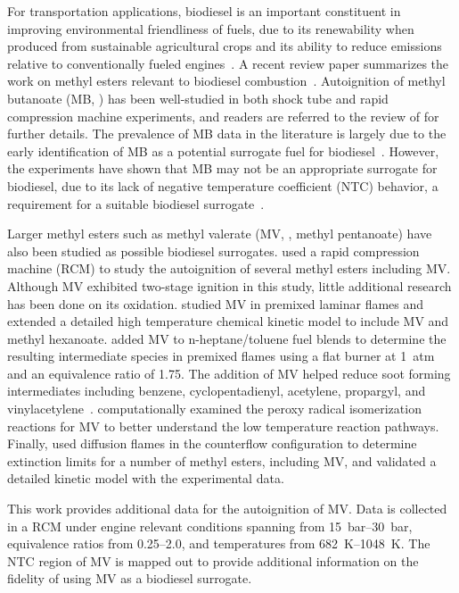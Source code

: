 \documentclass[12pt]{../ussci}
\begin{document}
For transportation applications, biodiesel is an important constituent in
improving environmental friendliness of fuels, due to its renewability when
produced from sustainable agricultural crops and its ability to reduce emissions
relative to conventionally fueled engines~\autocite{Hoekman2012}. A recent
review paper summarizes the work on methyl esters relevant to biodiesel
combustion~\autocite{Coniglio2013}. Autoignition of methyl butanoate (MB,
) has been well-studied in both shock tube and rapid compression
machine experiments, and readers are referred to the review of
\textcite{Coniglio2013} for further details. The prevalence of MB data in the
literature is largely due to the early identification of MB as a potential
surrogate fuel for biodiesel~\autocite{Fisher2000}. However, the experiments
have shown that MB may not be an appropriate surrogate for biodiesel, due to its
lack of negative temperature coefficient (NTC) behavior, a requirement for a
suitable biodiesel surrogate~\autocite{Coniglio2013}.

Larger methyl esters such as methyl valerate (MV, , methyl
pentanoate) have also been studied as possible biodiesel surrogates.
\textcite{Hadj-Ali2009} used a rapid compression machine (RCM) to study the
autoignition of several methyl esters including MV. Although MV exhibited
two-stage ignition in this study, little additional research has been done on
its oxidation. \textcite{Korobeinichev2015} studied MV in premixed laminar
flames and extended a detailed high temperature chemical kinetic model to
include MV and methyl hexanoate. \textcite{Dmitriev2015} added MV to
n-heptane/toluene fuel blends to determine the resulting intermediate species in
premixed flames using a flat burner at \SI{1}{atm} and an equivalence ratio of
1.75. The addition of MV helped reduce soot forming intermediates including
benzene, cyclopentadienyl, acetylene, propargyl, and
vinylacetylene~\autocite{Dmitriev2015}. \textcite{Hayes2009} computationally
examined the peroxy radical isomerization reactions for MV to better understand
the low temperature reaction pathways. Finally, \textcite{Dievart2013} used
diffusion flames in the counterflow configuration to determine extinction limits
for a number of methyl esters, including MV, and validated a detailed kinetic
model with the experimental data.

This work provides additional data for the autoignition of MV. Data is collected
in a RCM under engine relevant conditions spanning
from \SIrange{15}{30}{\bar}, equivalence ratios from \numrange{0.25}{2.0}, and
temperatures from \SIrange{682}{1048}{\K}. The NTC region of MV is mapped out to
provide additional information on the fidelity of using MV as a biodiesel
surrogate.
\end{document}
